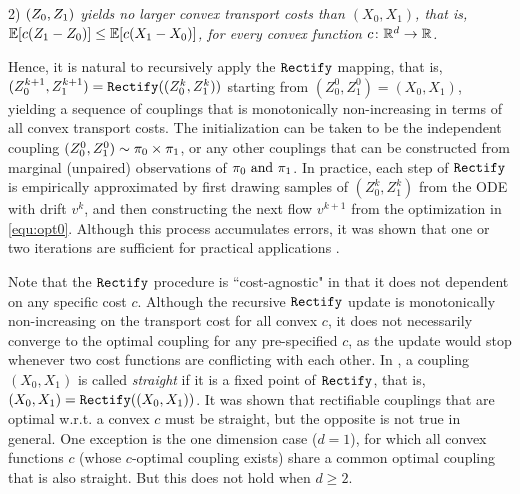 2) \emph{$(Z_0,Z_1)$ yields no larger convex transport costs than $(X_0,X_1)$, 
that is, $\mathbb{E}[c(Z_1-Z_0)] \leq \mathbb{E}[c(X_1-X_0)]$, 
for \emph{every} convex  function  $c\colon\mathbb{R}^d\to \mathbb{R}$.} 

Hence, it is natural to recursively apply the $\mathtt{Rectify}$ mapping, that is, 
       $(Z_0^{k+1}, Z_1^{k+1}) = \mathtt{Rectify}((Z^k_0,Z_1^k))$ starting from $ (Z_0^0, Z_1^0) = (X_0, X_1)$, 
yielding a sequence of 
 couplings
 that is monotonically 
non-increasing in terms of all convex transport costs. %
The initialization can be taken to be 
the independent coupling $(Z_0^0,Z_1^0) \sim {\pi}_0\times {\pi}_1$, 
or any other couplings that can be constructed from marginal (unpaired)  observations of $\text{${\pi}_0$ and ${\pi}_1$}$. 
In practice, 
each step of $\mathtt{Rectify}$ is empirically approximated by first drawing samples of $(Z_0^k, Z_1^k)$ from the ODE with drift $v^k$, and then constructing the next flow $v^{k+1}$ from the optimization in \eqref{equ:opt0}. Although this process accumulates errors, 
it was shown that one or two iterations are sufficient for practical applications \citep{rectified}.  


Note that the $\mathtt{Rectify}$ procedure  is ``cost-agnostic"
 in that it does not dependent on any specific cost $c$.
Although the recursive 
$\mathtt{Rectify}$ update is monotonically non-increasing on the transport cost for all convex $c$, it does not necessarily converge to the optimal coupling for any pre-specified $c$, 
as the update would stop whenever two cost functions are conflicting with each other. 
In \cite{rectified}, 
a coupling $(X_0,X_1)$ is called \emph{straight} if it is a fixed point of $\mathtt{Rectify}$, that is, $(X_0,X_1) = \mathtt{Rectify}((X_0,X_1))$. 
It was shown that rectifiable  couplings that are optimal w.r.t. a convex $c$ must be straight, but the opposite is not true in general. 
One exception is the one dimension case ($d=1$), for which all convex functions $c$ (whose $c$-optimal coupling exists) share a common optimal coupling that is also straight. 
But this does not hold when $d\geq 2$. %


